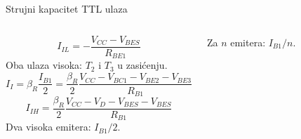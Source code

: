 \begin{frame}[label=10-s060]{Strujni kapacitet TTL ulaza}
\setlength{\abovedisplayskip}{4pt}\setlength{\belowdisplayskip}{4pt}\setlength{\abovedisplayshortskip}{3pt}\setlength{\belowdisplayshortskip}{3pt}
\begin{columns}[T,onlytextwidth]\centering \raggedright
\[I_{IL}=-\frac{V_{CC}-V_{BES}}{R_{BE1}}\]
Oba ulaza visoka: $T_2$ i $T_3$ u zasićenju.
\[I_I=\beta_R\frac{I_{B1}}2=\frac{\beta_R}2\frac{V_{CC}-V_{BC1}-V_{BE2}-V_{BE3}}{R_{B1}}\]
\[I_{IH}=\frac{\beta_R}2\frac{V_{CC}-V_D-V_{BES}-V_{BES}}{R_{B1}}\]
Dva visoka emitera: $I_{B1}/2$.\par
Za $n$ emitera: $I_{B1}/n$.\end{columns}
\end{frame}
